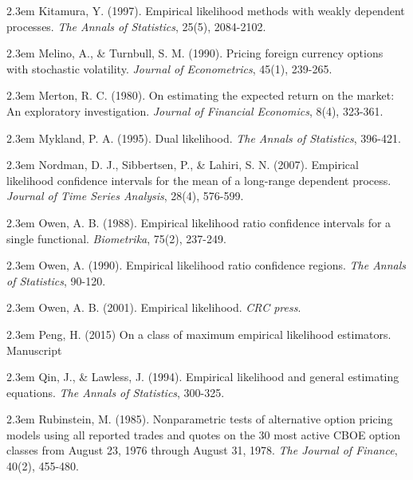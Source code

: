 \documentclass[oneside,english]{amsbook}
\numberwithin{section}{chapter}
\numberwithin{equation}{section}
\numberwithin{figure}{section}
\theoremstyle{plain}
\theoremstyle{plain}
\theoremstyle{definition}
\theoremstyle{plain}
\theoremstyle{plain}
\theoremstyle{remark}
\theoremstyle{definition}
\theoremstyle{definition}
\begin{document}
\par\noindent\hangindent2.3em
Kitamura, Y. (1997). Empirical likelihood methods with weakly dependent processes. {\em The Annals of Statistics}, 25(5), 2084-2102.

\par\noindent\hangindent2.3em
Melino, A., \& Turnbull, S. M. (1990). Pricing foreign currency options with stochastic volatility. {\em Journal of Econometrics}, 45(1), 239-265.


\par\noindent\hangindent2.3em
Merton, R. C. (1980). On estimating the expected return on the market: An exploratory investigation. {\em Journal of Financial Economics}, 8(4), 323-361.

\par\noindent\hangindent2.3em
Mykland, P. A. (1995). Dual likelihood. {\em The Annals of Statistics}, 396-421.

\par\noindent\hangindent2.3em
Nordman, D. J., Sibbertsen, P., \& Lahiri, S. N. (2007). Empirical likelihood confidence intervals for the mean of a long-range dependent process. {\em Journal of Time Series Analysis}, 28(4), 576-599.

\par\noindent\hangindent2.3em
Owen, A. B. (1988). Empirical likelihood ratio confidence intervals for a single functional. {\em Biometrika}, 75(2), 237-249.

\par\noindent\hangindent2.3em
Owen, A. (1990). Empirical likelihood ratio confidence regions. {\em The Annals of Statistics}, 90-120.

\par\noindent\hangindent2.3em
Owen, A. B. (2001). Empirical likelihood. {\em CRC press}.

\par\noindent\hangindent2.3em
Peng, H. (2015) On a class of maximum empirical likelihood estimators. Manuscript



\par\noindent\hangindent2.3em
Qin, J., \& Lawless, J. (1994). Empirical likelihood and general estimating equations. {\em The Annals of Statistics}, 300-325.

\par\noindent\hangindent2.3em
Rubinstein, M. (1985). Nonparametric tests of alternative option pricing models using all reported trades and quotes on the 30 most active CBOE option classes from August 23, 1976 through August 31, 1978. {\em The Journal of Finance}, 40(2), 455-480.
\end{document}
